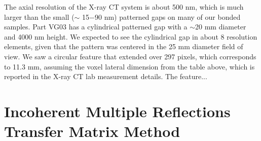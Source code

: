 \documentclass[osajnl,preprint,showpacs,superscriptaddress,12pt]{revtex4-1} %
\begin{document}
The axial resolution of the X-ray CT system is about 500 nm, which is much larger than the small ($\sim$ 15$-$90 nm) patterned gaps on many of our bonded samples.  Part VG03 has a cylindrical patterned gap with a $\sim$20 mm diameter and 4000 nm height.  We expected to see the cylindrical gap in about 8 resolution elements, given that the pattern was centered in the 25 mm diameter field of view.  We saw a circular feature that extended over 297 pixels, which corresponds to 11.3 mm, assuming the voxel lateral dimension from the table above, which is reported in the X-ray CT lab measurement details.  The feature...


\section{Incoherent Multiple Reflections Transfer Matrix Method}
\label{sec:Append-IMRTMM}
\end{document}
